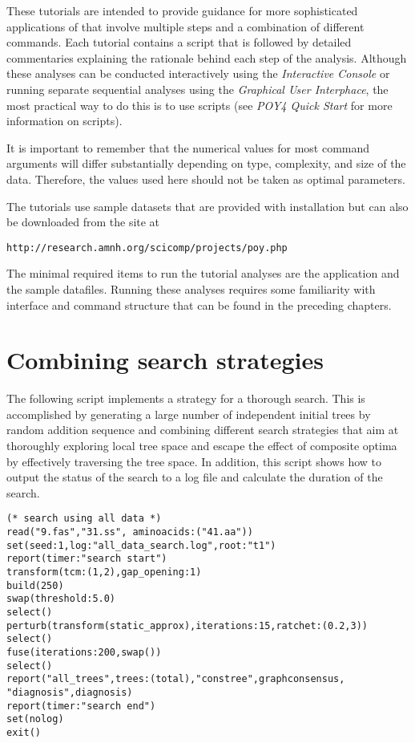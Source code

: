 These tutorials are intended to provide guidance for more sophisticated applications of \poy that involve multiple steps and a combination of different commands. Each tutorial contains a \poy script that is followed by detailed commentaries explaining the rationale behind each step of the analysis. Although these analyses can be conducted interactively using the \emph{Interactive Console} or running separate sequential analyses using the \emph{Graphical User Interphace}, the most practical way to do this is to use \poy scripts (see \emph{ POY4 Quick Start} for more information on \poy scripts).

It is important to remember that the numerical values for most command arguments will differ substantially depending on type, complexity, and size of the data. Therefore, the values used here should not be taken as optimal parameters.

The tutorials use sample datasets that are provided with \poy installation but can also be downloaded from the \poy site at
\begin{center}
\texttt{http://research.amnh.org/scicomp/projects/poy.php}
\end{center}
The minimal required items to run the tutorial analyses are the \poy application and the sample datafiles. Running these analyses requires some familiarity with \poy interface and command structure that can be found in the preceding chapters.

\section{Combining  search strategies}{\label{tutorial1}}
The following script implements a strategy for a thorough search. This is accomplished by generating a large number of independent initial trees by random addition sequence and combining different search strategies that aim at thoroughly exploring local tree space and escape the effect of composite optima by effectively traversing the tree space. In addition, this script shows how to output the status of the search to a log file and calculate the duration of the search. 

\begin{verbatim}
(* search using all data *)
read("9.fas","31.ss", aminoacids:("41.aa"))
set(seed:1,log:"all_data_search.log",root:"t1")
report(timer:"search start")
transform(tcm:(1,2),gap_opening:1)
build(250)
swap(threshold:5.0)
select()
perturb(transform(static_approx),iterations:15,ratchet:(0.2,3))
select()
fuse(iterations:200,swap())
select()
report("all_trees",trees:(total),"constree",graphconsensus,
"diagnosis",diagnosis)
report(timer:"search end")
set(nolog)
exit()
\end{verbatim}

